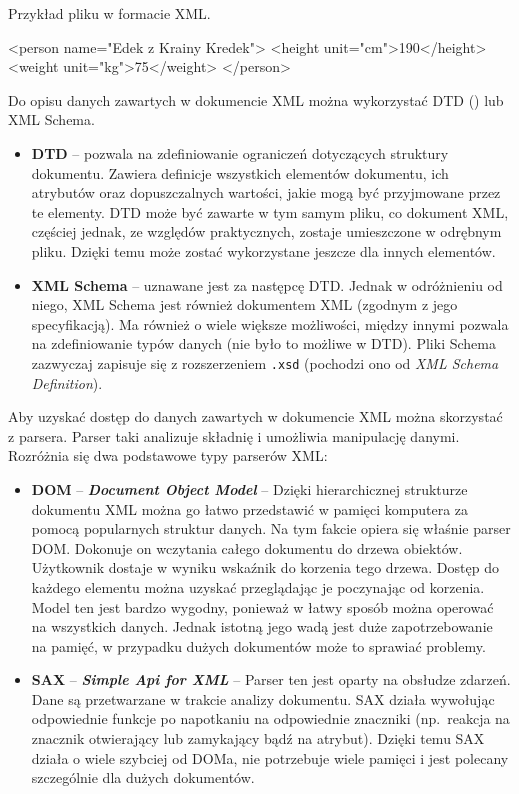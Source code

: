 \begin{listing}[th]
\caption{Przykład pliku w formacie XML.}
\begin{codeblock}
<person name="Edek z Krainy Kredek">
<height unit="cm">190</height>
<weight unit="kg">75</weight>
</person>
\end{codeblock}
\end{listing}

Do opisu danych zawartych w dokumencie XML można wykorzystać DTD () lub XML Schema.
\begin{itemize}
	\item \textbf{DTD} -- pozwala na zdefiniowanie ograniczeń dotyczących struktury dokumentu. Zawiera definicje wszystkich elementów dokumentu, 
	ich atrybutów oraz dopuszczalnych wartości, jakie mogą być przyjmowane przez te elementy. DTD może być zawarte w tym samym pliku, co 
	dokument XML, częściej jednak, ze względów praktycznych, zostaje umieszczone w odrębnym pliku. Dzięki temu może zostać wykorzystane 
	jeszcze dla innych elementów.
	\item \textbf{XML Schema} -- uznawane jest za następcę DTD. Jednak w odróżnieniu od niego, XML Schema jest również dokumentem XML 
	(zgodnym z jego specyfikacją). Ma również o wiele większe możliwości, między innymi pozwala na zdefiniowanie typów danych (nie było to możliwe w DTD). 
	Pliki Schema zazwyczaj zapisuje się z rozszerzeniem \texttt{.xsd} (pochodzi ono od \emph{XML Schema Definition}).
\end{itemize}

Aby uzyskać dostęp do danych zawartych w dokumencie XML można skorzystać z parsera. Parser taki analizuje składnię i umożliwia manipulację 
danymi. Rozróżnia się dwa podstawowe typy parserów XML:
\begin{itemize}
	\item \textbf{DOM} -- \textbf{\emph{Document Object Model}} -- Dzięki hierarchicznej strukturze dokumentu XML można go łatwo przedstawić w pamięci komputera 
	za pomocą popularnych struktur danych. Na tym fakcie opiera się właśnie parser DOM. Dokonuje on wczytania całego dokumentu do drzewa obiektów. 
	Użytkownik dostaje w wyniku wskaźnik do korzenia tego drzewa. Dostęp do każdego elementu można uzyskać przeglądając je poczynając od korzenia. 
	Model ten jest bardzo wygodny, ponieważ w łatwy sposób można operować na wszystkich danych. Jednak istotną jego wadą jest duże zapotrzebowanie 
	na pamięć, w przypadku dużych dokumentów może to sprawiać problemy.
	\item \textbf{SAX} -- \textbf{\emph{Simple Api for XML}} -- Parser ten jest oparty na obsłudze zdarzeń. Dane są przetwarzane w trakcie analizy dokumentu. 
	SAX działa wywołując odpowiednie funkcje po napotkaniu na odpowiednie znaczniki (np.~reakcja na znacznik otwierający lub zamykający bądź na atrybut).
	Dzięki temu SAX działa o wiele szybciej od DOMa, nie potrzebuje wiele pamięci i jest polecany szczególnie dla dużych dokumentów.
\end{itemize}

